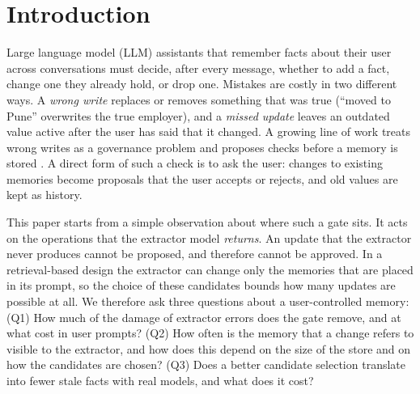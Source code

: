 \IfFileExists{IEEEtran.cls}{\documentclass[journal]{IEEEtran}\def\HAVEIEEE{1}}{\documentclass[10pt,twocolumn]{article}\usepackage[margin=0.7in,columnsep=0.25in]{geometry}}
\begin{document}
\section{Introduction}
Large language model (LLM) assistants that remember facts about their user across conversations must decide, after every message, whether to add a fact, change one they already hold, or drop one. Mistakes are costly in two different ways. A \emph{wrong write} replaces or removes something that was true (``moved to Pune'' overwrites the true employer), and a \emph{missed update} leaves an outdated value active after the user has said that it changed. A growing line of work treats wrong writes as a governance problem and proposes checks before a memory is stored \cite{lam2026ssgm}. A direct form of such a check is to ask the user: changes to existing memories become proposals that the user accepts or rejects, and old values are kept as history.

This paper starts from a simple observation about where such a gate sits. It acts on the operations that the extractor model \emph{returns}. An update that the extractor never produces cannot be proposed, and therefore cannot be approved. In a retrieval-based design the extractor can change only the memories that are placed in its prompt, so the choice of these candidates bounds how many updates are possible at all. We therefore ask three questions about a user-controlled memory: (Q1) How much of the damage of extractor errors does the gate remove, and at what cost in user prompts? (Q2) How often is the memory that a change refers to visible to the extractor, and how does this depend on the size of the store and on how the candidates are chosen? (Q3) Does a better candidate selection translate into fewer stale facts with real models, and what does it cost?
\end{document}

